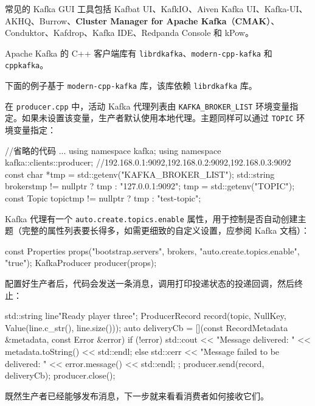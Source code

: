 \label{idx:1544}
常见的 Kafka GUI 工具包括 Kafbat UI、KafkIO、Aiven Kafka UI、Kafka-UI、AKHQ、Burrow、\textbf{Cluster Manager for Apache Kafka}（\textbf{CMAK}）、Conduktor、Kafdrop、Kafka IDE、Redpanda Console 和 kPow。

Apache Kafka 的 C++ 客户端库有 \texttt{librdkafka}、\texttt{modern-cpp-kafka} 和 \texttt{cppkafka}。

下面的例子基于 \texttt{modern-cpp-kafka} 库，该库依赖 \texttt{librdkafka} 库。

在 \texttt{producer.\allowbreak{}cpp} 中，活动 Kafka 代理列表由 \texttt{KAFKA\_\allowbreak{}BROKER\_\allowbreak{}LIST} 环境变量指定。如果未设置该变量，生产者默认使用本地代理。主题同样可以通过 \texttt{TOPIC} 环境变量指定：

\begin{codebox}[cpp]
//省略的代码
...
using namespace kafka;
using namespace kafka::clients::producer;
//192.168.0.1:9092,192.168.0.2:9092,192.168.0.3:9092
const char *tmp = std::getenv("KAFKA_BROKER_LIST");
std::string brokers{tmp != nullptr ? tmp : "127.0.0.1:9092"};
tmp = std::getenv("TOPIC");
const Topic topic{tmp != nullptr ? tmp : "test-topic"};
\end{codebox}

\label{idx:1545}
\label{idx:1546}
Kafka 代理有一个 \texttt{auto.\allowbreak{}create.\allowbreak{}topics.\allowbreak{}enable} 属性，用于控制是否自动创建主题（完整的属性列表要长得多，如需更细致的自定义设置，应参阅 Kafka 文档）：

\begin{codebox}[text]
const Properties props({{"bootstrap.servers", {brokers}},
                        {"auto.create.topics.enable", {"true"}}});
KafkaProducer producer(props);
\end{codebox}

配置好生产者后，代码会发送一条消息，调用打印投递状态的投递回调，然后终止：

\begin{codebox}[cpp]
std::string line{"Ready player three"};
ProducerRecord record(topic, NullKey, Value(line.c_str(), line.size()));
auto deliveryCb = [](const RecordMetadata &metadata, const Error &error) {
  if (!error) {
    std::cout << "Message delivered: " << metadata.toString() << std::endl;
  } else {
    std::cerr << "Message failed to be delivered: " << error.message()
              << std::endl;
  }
};
producer.send(record, deliveryCb);
producer.close();
\end{codebox}

既然生产者已经能够发布消息，下一步就来看看消费者如何接收它们。

